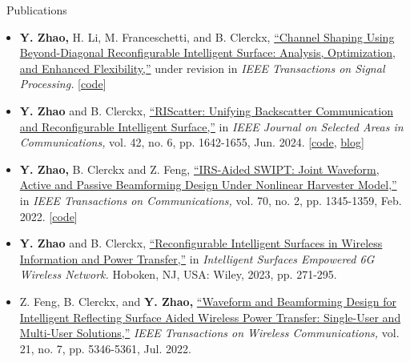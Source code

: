 \documentclass{cv}
\begin{document}
\begin{section}{\faPencil\ Publications}
	\begin{itemize}
		\item \textbf{Y. Zhao,} H. Li, M. Franceschetti, and B. Clerckx, \href{https://arxiv.org/pdf/2407.15196}{``Channel Shaping Using Beyond-Diagonal Reconfigurable Intelligent Surface: Analysis, Optimization, and Enhanced Flexibility,''} under revision in \emph{IEEE Transactions on Signal Processing.} [\href{https://github.com/snowztail/channel-shaping/}{code}]
		\item \textbf{Y. Zhao} and B. Clerckx, \href{https://ieeexplore.ieee.org/document/10500436}{``RIScatter: Unifying Backscatter Communication and Reconfigurable Intelligent Surface,''} in \emph{IEEE Journal on Selected Areas in Communications,} vol. 42, no. 6, pp. 1642-1655, Jun. 2024. [\href{https://github.com/snowztail/riscatter-unifying-backscatter-communication-and-reconfigurable-intelligent-surface/tree/master/src}{code}, \href{https://www.comsoc.org/publications/blogs/selected-ideas-communications/backscattering-reconfigurable-intelligent-surfaces-and-ambient-iot}{blog}]
		\item \textbf{Y. Zhao,} B. Clerckx and Z. Feng, \href{https://ieeexplore.ieee.org/document/9623452}{``IRS-Aided SWIPT: Joint Waveform, Active and Passive Beamforming Design Under Nonlinear Harvester Model,''} in \emph{IEEE Transactions on Communications,} vol. 70, no. 2, pp. 1345-1359, Feb. 2022. [\href{https://github.com/snowztail/irs-aided-swipt-joint-waveform-active-and-passive-beamforming-design-under-nonlinear-harvester-model/tree/master/src/}{code}]
		\item \textbf{Y. Zhao} and B. Clerckx, \href{https://onlinelibrary.wiley.com/doi/abs/10.1002/9781119913122.ch13}{``Reconfigurable Intelligent Surfaces in Wireless Information and Power Transfer,''} in \emph{Intelligent Surfaces Empowered 6G Wireless Network.} Hoboken, NJ, USA: Wiley, 2023, pp. 271-295.
		\item Z. Feng, B. Clerckx, and \textbf{Y. Zhao,} \href{https://ieeexplore.ieee.org/document/9676462}{``Waveform and Beamforming Design for Intelligent Reflecting Surface Aided Wireless Power Transfer: Single-User and Multi-User Solutions,''} \emph{IEEE Transactions on Wireless Communications,} vol. 21, no. 7, pp. 5346-5361, Jul. 2022.
	\end{itemize}
\end{section}

\vspace{-1.5em}
\end{document}
